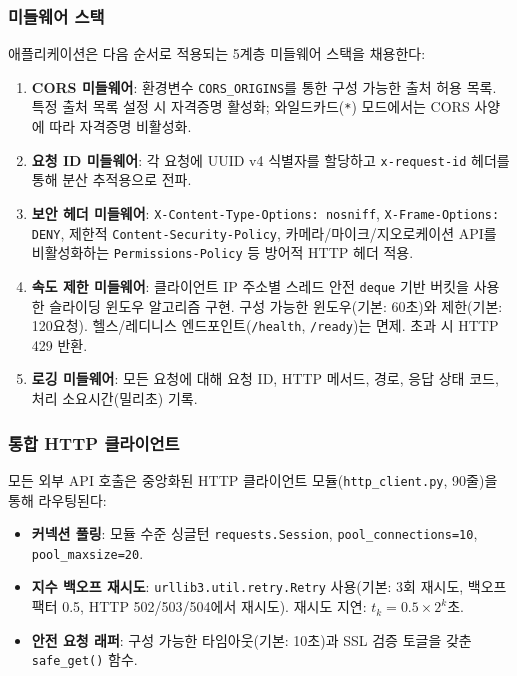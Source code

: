 \documentclass[preprint,12pt]{elsarticle}
\begin{document}
\subsubsection{미들웨어 스택}

애플리케이션은 다음 순서로 적용되는 5계층 미들웨어 스택을 채용한다:

\begin{enumerate}
  \item \textbf{CORS 미들웨어}: 환경변수 \texttt{CORS\_ORIGINS}를 통한 구성 가능한 출처 허용 목록. 특정 출처 목록 설정 시 자격증명 활성화; 와일드카드(\texttt{*}) 모드에서는 CORS 사양에 따라 자격증명 비활성화.

  \item \textbf{요청 ID 미들웨어}: 각 요청에 UUID v4 식별자를 할당하고 \texttt{x-request-id} 헤더를 통해 분산 추적용으로 전파.

  \item \textbf{보안 헤더 미들웨어}: \texttt{X-Content-Type-Options: nosniff}, \texttt{X-Frame-Options: DENY}, 제한적 \texttt{Content-Security-Policy}, 카메라/마이크/지오로케이션 API를 비활성화하는 \texttt{Permissions-Policy} 등 방어적 HTTP 헤더 적용.

  \item \textbf{속도 제한 미들웨어}: 클라이언트 IP 주소별 스레드 안전 \texttt{deque} 기반 버킷을 사용한 슬라이딩 윈도우 알고리즘 구현. 구성 가능한 윈도우(기본: 60초)와 제한(기본: 120요청). 헬스/레디니스 엔드포인트(\texttt{/health}, \texttt{/ready})는 면제. 초과 시 HTTP 429 반환.

  \item \textbf{로깅 미들웨어}: 모든 요청에 대해 요청 ID, HTTP 메서드, 경로, 응답 상태 코드, 처리 소요시간(밀리초) 기록.
\end{enumerate}

\subsubsection{통합 HTTP 클라이언트}

모든 외부 API 호출은 중앙화된 HTTP 클라이언트 모듈(\texttt{http\_client.py}, 90줄)을 통해 라우팅된다:

\begin{itemize}
  \item \textbf{커넥션 풀링}: 모듈 수준 싱글턴 \texttt{requests.Session}, \texttt{pool\_connections=10}, \texttt{pool\_maxsize=20}.
  \item \textbf{지수 백오프 재시도}: \texttt{urllib3.util.retry.Retry} 사용(기본: 3회 재시도, 백오프 팩터 0.5, HTTP 502/503/504에서 재시도). 재시도 지연: $t_k = 0.5 \times 2^k$초.
  \item \textbf{안전 요청 래퍼}: 구성 가능한 타임아웃(기본: 10초)과 SSL 검증 토글을 갖춘 \texttt{safe\_get()} 함수.
\end{itemize}
\end{document}
